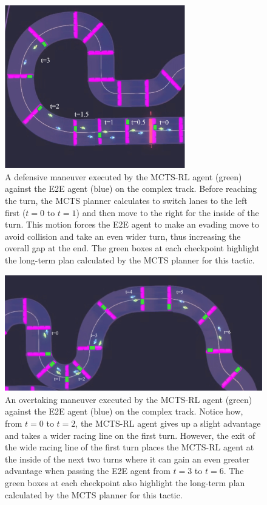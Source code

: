  \FloatBarrier
 \begin{figure}
    \centering  \includegraphics[width=0.7\textwidth]{Figures/MCTSRLDefense.png}
  \caption[Defensive maneuver by MCTS-RL controller.]{A defensive maneuver executed by the MCTS-RL agent (green) against the E2E agent (blue) on the complex track.  Before reaching the turn, the MCTS planner calculates to switch lanes to the left first ($t=0$ to $t=1$) and then move to the right for the inside of the turn. This motion forces the E2E agent to make an evading move to avoid collision and take an even wider turn, thus increasing the overall gap at the end. The green boxes at each checkpoint highlight the long-term plan calculated by the MCTS planner for this tactic.}
  \label{fig:mctsrl:defense}
\end{figure}

 \begin{figure}
  \centering
  \includegraphics[width=\textwidth]{Figures/MCTSRLOvertake.png}
  \caption [Overtaking maneuver by MCTS-RL controller.] {An overtaking maneuver executed by the MCTS-RL agent (green) against the E2E agent (blue) on the complex track. Notice how, from $t=0$ to $t=2$, the MCTS-RL agent gives up a slight advantage and takes a wider racing line on the first turn. However, the exit of the wide racing line of the first turn places the MCTS-RL agent at the inside of the next two turns where it can gain an even greater advantage when passing the E2E agent from $t=3$ to $t=6$. The green boxes at each checkpoint also highlight the long-term plan calculated by the MCTS planner for this tactic.}
  \label{fig:mctsrl:overtake}
\end{figure}

